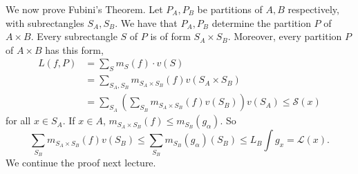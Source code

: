 We now prove Fubini's Theorem. Let $P_A, P_B$ be partitions of $A, B$ respectively, with subrectangles $S_A, S_B$. We have that $P_A, P_B$ determine the partition $P$ of $A \times B$. Every subrectangle $S$ of $P$ is of form $S_A \times S_B$. Moreover, every partition $P$ of $A \times B$ has this form,
\begin{align*}
    L(f, P) &= \sum_S m_S(f) \cdot v(S) \\
    &= \sum_{S_A, S_B} m_{S_A \times S_B} (f) v(S_A \times S_B) \\
    &= \sum_{S_A} \left( \sum_{S_B} m_{S_A \times S_B} (f) v(S_B) \right) v(S_A) \leq \mathcal{S}(x)
\end{align*}
for all $x \in S_A$. If $x \in A$, $m_{S_A \times S_B}(f) \leq m_{S_B}(g_\alpha)$. So
\[ \sum_{S_B} m_{S_A \times S_B} (f) v(S_B) \leq \sum_{S_B} m_{S_B}(g_\alpha) (S_B) \leq L_B \int g_x = \mathcal{L}(x). \]
We continue the proof next lecture.
